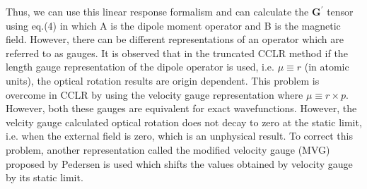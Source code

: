 Thus, we can use this linear response formalism and can calculate the $\textbf{G}^\prime$ tensor
using eq.(4) in which A is the dipole moment operator and B is the magnetic field. However, there 
can be different representations of an operator which are referred to as gauges. It is observed that 
in the truncated CCLR method if the length gauge representation of the dipole operator is used, i.e. $\mu \equiv r$ (in atomic units), the optical rotation results are origin dependent. This problem is overcome in CCLR by using the velocity
gauge representation where $\mu \equiv r\times p$. However, both these gauges are equivalent for 
exact wavefunctions. However, the velcity gauge calculated optical rotation does not decay to zero 
at the static limit, i.e. when the external field is zero, which is an unphysical result. 
To correct this problem, another representation called the modified velocity gauge (MVG)
proposed by Pedersen \cite{Pedersen04} is used which shifts the values obtained
by velocity gauge by its static limit. 



